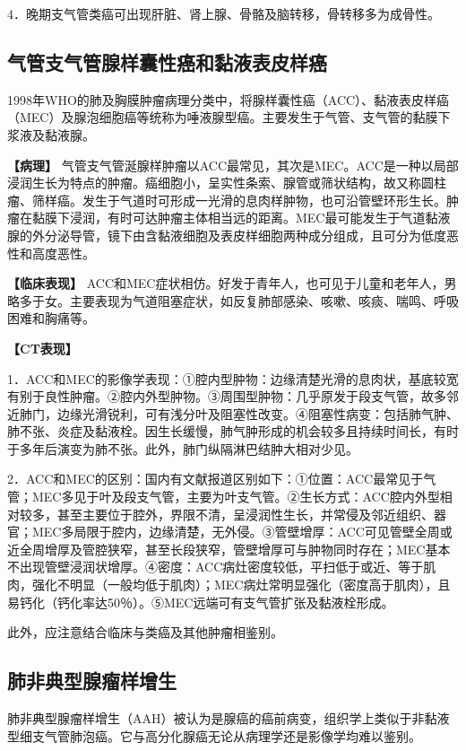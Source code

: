 4．晚期支气管类癌可出现肝脏、肾上腺、骨骼及脑转移，骨转移多为成骨性。

\subsection{气管支气管腺样囊性癌和黏液表皮样癌}

1998年WHO的肺及胸膜肿瘤病理分类中，将腺样囊性癌（ACC）、黏液表皮样癌（MEC）及腺泡细胞癌等统称为唾液腺型癌。主要发生于气管、支气管的黏膜下浆液及黏液腺。

\textbf{【病理】}
气管支气管涎腺样肿瘤以ACC最常见，其次是MEC。ACC是一种以局部浸润生长为特点的肿瘤。癌细胞小，呈实性条索、腺管或筛状结构，故又称圆柱瘤、筛样癌。发生于气道时可形成一光滑的息肉样肿物，也可沿管壁环形生长。肿瘤在黏膜下浸润，有时可达肿瘤主体相当远的距离。MEC最可能发生于气道黏液腺的外分泌导管，镜下由含黏液细胞及表皮样细胞两种成分组成，且可分为低度恶性和高度恶性。

\textbf{【临床表现】}
ACC和MEC症状相仿。好发于青年人，也可见于儿童和老年人，男略多于女。主要表现为气道阻塞症状，如反复肺部感染、咳嗽、咳痰、喘鸣、呼吸困难和胸痛等。

\textbf{【CT表现】}

1．ACC和MEC的影像学表现：①腔内型肿物：边缘清楚光滑的息肉状，基底较宽有别于良性肿瘤。②腔内外型肿物。③周围型肿物：几乎原发于段支气管，故多邻近肺门，边缘光滑锐利，可有浅分叶及阻塞性改变。④阻塞性病变：包括肺气肿、肺不张、炎症及黏液栓。因生长缓慢，肺气肿形成的机会较多且持续时间长，有时于多年后演变为肺不张。此外，肺门纵隔淋巴结肿大相对少见。

2．ACC和MEC的区别：国内有文献报道区别如下：①位置：ACC最常见于气管；MEC多见于叶及段支气管，主要为叶支气管。②生长方式：ACC腔内外型相对较多，甚至主要位于腔外，界限不清，呈浸润性生长，并常侵及邻近组织、器官；MEC多局限于腔内，边缘清楚，无外侵。③管壁增厚：ACC可见管壁全周或近全周增厚及管腔狭窄，甚至长段狭窄，管壁增厚可与肿物同时存在；MEC基本不出现管壁浸润状增厚。④密度：ACC病灶密度较低，平扫低于或近、等于肌肉，强化不明显（一般均低于肌肉）；MEC病灶常明显强化（密度高于肌肉），且易钙化（钙化率达50％）。⑤MEC远端可有支气管扩张及黏液栓形成。

此外，应注意结合临床与类癌及其他肿瘤相鉴别。

\subsection{肺非典型腺瘤样增生}

肺非典型腺瘤样增生（AAH）被认为是腺癌的癌前病变，组织学上类似于非黏液型细支气管肺泡癌。它与高分化腺癌无论从病理学还是影像学均难以鉴别。


